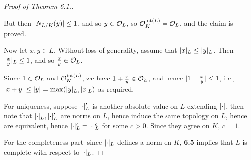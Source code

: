 \documentclass[10pt,a4paper]{article}
\begin{document}
\begin{proof}[Proof of Theorem 6.1.]
\begin{enumerate}
    But then $\lvert N_{L/K}(y)\rvert\leq 1$, and so $y \in \mathcal{O}_L$, so $\mathcal{O}_K^{\operatorname{int}(L)} = \mathcal{O}_L$, and the claim is proved.

    Now let $x, y \in L$. Without loss of generality, assume that $\lvert x\rvert_L \leq \lvert y\rvert_L$. Then $\lvert\frac{x}{y}\rvert_L \leq 1$, and so $\frac{x}{y} \in \mathcal{O}_L$.

    Since $1 \in \mathcal{O}_L$ and $\mathcal{O}_K^{\operatorname{int}(L)}$, we have $1 + \frac{x}{y} \in \mathcal{O}_L$, and hence $\lvert1+\frac{x}{y}\rvert \leq 1$, i.e., $\lvert x+y\rvert \leq \lvert y\rvert = \max(\lvert y\rvert_L, \lvert x\rvert_L)$ as required.
  \end{enumerate}

  For uniqueness, suppose $\lvert\cdot\rvert'_L$ is another absolute value on $L$ extending $\lvert\cdot\rvert$, then note that $\lvert\cdot\rvert_L, \lvert\cdot\rvert'_L$ are norms on $L$, hence induce the same topology on $L$, hence are equivalent, hence $\lvert\cdot\rvert_L' = \lvert\cdot\rvert_L^c$ for some $c>0$. Since they agree on $K$, $c = 1$.

  For the completeness part, since $\lvert\cdot\rvert_L$ defines a norm on $K$, \textbf{6.5} implies that $L$ is complete with respect to $\lvert\cdot\rvert_L$.
\end{proof}
\end{document}
